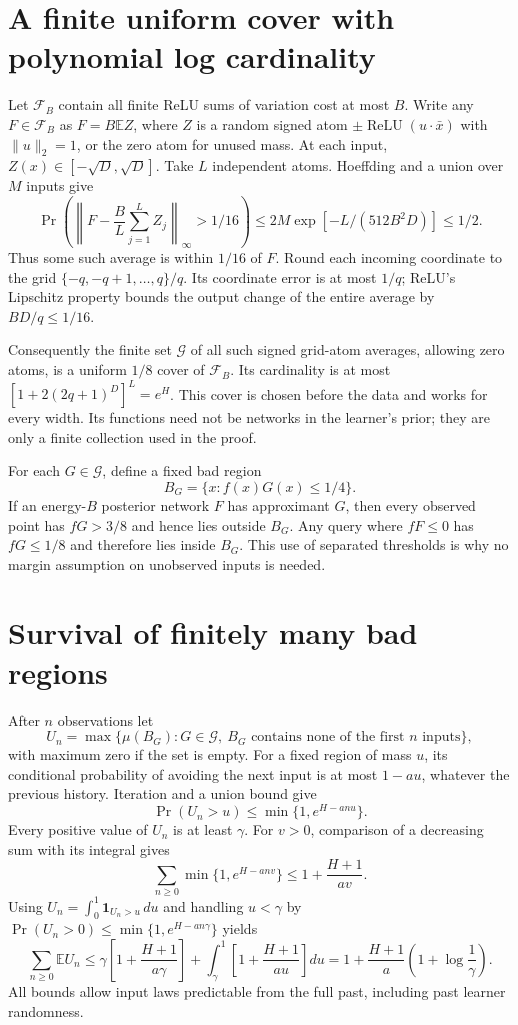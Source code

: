 \documentclass[11pt]{article}
\newcommand{\E}{\mathbb E}\newcommand{\R}{\mathbb R}
\newcommand{\relu}{\operatorname{ReLU}}
\begin{document}
\section{A finite uniform cover with polynomial log cardinality}
Let $\mathcal F_B$ contain all finite ReLU sums of variation cost at
most $B$. Write any $F\in\mathcal F_B$ as
$F=B\E Z$, where $Z$ is a random signed atom
$\pm\relu(u\cdot\bar x)$ with $\|u\|_2=1$, or the zero atom for
unused mass. At each input, $Z(x)\in[-\sqrt D,\sqrt D]$.
Take $L$ independent atoms. Hoeffding and a union over $M$ inputs give
\[
 \Pr\left(\left\|F-\frac BL\sum_{j=1}^LZ_j\right\|_\infty
                                      >1/16\right)
 \le2M\exp[-L/(512B^2D)]\le1/2.                          \tag{6}
\]
Thus some such average is within $1/16$ of $F$.
Round each incoming coordinate to the grid
$\{-q,-q+1,\ldots,q\}/q$. Its coordinate error is at most $1/q$;
ReLU's Lipschitz property bounds the output change of the entire average
by $BD/q\le1/16$.

Consequently the finite set $\mathcal G$ of all such signed grid-atom
averages, allowing zero atoms, is a uniform $1/8$ cover of
$\mathcal F_B$. Its cardinality is at most
$[1+2(2q+1)^D]^L=e^H$. This cover is chosen before the data and works
for every width. Its functions need not be networks in the learner's
prior; they are only a finite collection used in the proof.

For each $G\in\mathcal G$, define a fixed bad region
\[
                    B_G=\{x:f(x)G(x)\le1/4\}.
\]
If an energy-$B$ posterior network $F$ has approximant $G$, then every
observed point has $fG>3/8$ and hence lies outside $B_G$. Any query
where $fF\le0$ has $fG\le1/8$ and therefore lies inside $B_G$.
This use of separated thresholds is why no margin assumption on
unobserved inputs is needed.

\section{Survival of finitely many bad regions}
After $n$ observations let
\[
 U_n=\max\{\mu(B_G):G\in\mathcal G,\ B_G
                     \text{ contains none of the first }n\text{ inputs}\},
\]
with maximum zero if the set is empty. For a fixed region of mass $u$,
its conditional probability of avoiding the next input is at most
$1-au$, whatever the previous history. Iteration and a union bound give
\[
                  \Pr(U_n>u)\le\min\{1,e^{H-anu}\}.       \tag{7}
\]
Every positive value of $U_n$ is at least $\gamma$. For $v>0$,
comparison of a decreasing sum with its integral gives
\[
 \sum_{n\ge0}\min\{1,e^{H-anv}\}
                      \le1+\frac{H+1}{av}.
\]
Using $U_n=\int_0^1\mathbf1_{U_n>u}\,du$ and handling $u<\gamma$
by $\Pr(U_n>0)\le\min\{1,e^{H-an\gamma}\}$ yields
\[
 \sum_{n\ge0}\E U_n
 \le\gamma\left[1+\frac{H+1}{a\gamma}\right]
       +\int_\gamma^1\left[1+\frac{H+1}{au}\right]du
 =1+\frac{H+1}{a}\left(1+\log\frac1\gamma\right).         \tag{8}
\]
All bounds allow input laws predictable from the full past, including
past learner randomness.
\end{document}
